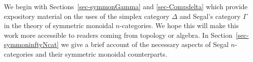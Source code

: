 \documentclass[a4paper]{amsart}
\begin{document}
We begin with Sections~\ref{sec-symmonGamma} and \ref{sec-Compdelta} which provide expository material on the uses of the simplex category $\Delta$ and Segal's category $\Gamma$ in the theory of symmetric monoidal $n$-categories. We hope this will make this work more accessible to readers coming from topology or algebra. In Section~\ref{sec-symmoninftyNcat} we give a brief account of the necessary aspects of Segal $n$-categories and their symmetric monoidal counterparts. 






\end{document}
